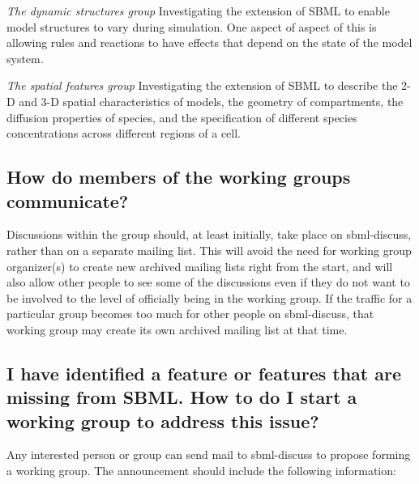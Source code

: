 \documentclass{sbmlfaq}
\begin{document}
\begin{description}
\item \emph{The dynamic structures group}
  Investigating the extension of SBML to enable model structures to vary
  during simulation.  One aspect of aspect of this is allowing rules and
  reactions to have effects that depend on the state of the model system.
  
\item \emph{The spatial features group}
  Investigating the extension of SBML to describe the 2-D and 3-D spatial
  characteristics of models, the geometry of compartments, the diffusion
  properties of species, and the specification of different species
  concentrations across different regions of a cell.


\end{description}

\subsection{How do members of the working groups communicate?}

Discussions within the group should, at least initially,
   take place on sbml-discuss, rather than on a separate
   mailing list.  This will avoid the need for working group
   organizer(s) to create new archived mailing lists right
   from the start, and will also allow other people to see
   some of the discussions even if they do not want to be
   involved to the level of officially being in the working
   group.  If the traffic for a particular group becomes too
   much for other people on sbml-discuss, that working group
   may create its own archived mailing list at that time.

\subsection{I have identified a feature or features that are missing from
  SBML.  How to do I start a working group to address this issue?}  

Any interested person or group can send mail to
   sbml-discuss to propose forming a working group.  The
   announcement should include the following information:
\end{document}

